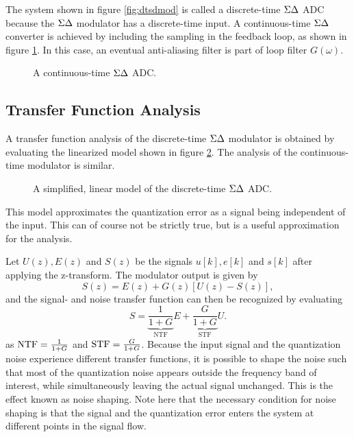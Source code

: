 The system shown in figure \ref{fig:dtsdmod} is called a discrete-time $\Sigma\Delta$ ADC because the $\Sigma\Delta$ modulator has a discrete-time input. A continuous-time $\Sigma\Delta$ converter is achieved by including the sampling in the feedback loop, as shown in figure \ref{fig:ctsdmod}. In this case, an eventual anti-aliasing filter is part of loop filter $G(\omega)$.
\begin{figure}[htbp]
    
    \centering
    \caption{A continuous-time $\Sigma\Delta$ ADC.}
    \label{fig:ctsdmod}
\end{figure}

\subsection{Transfer Function Analysis}
\label{sec:sd_tf_analysis}
A transfer function analysis of the discrete-time $\Sigma\Delta$ modulator is obtained by evaluating the linearized model shown in figure \ref{fig:dtsdmod_lin}. The analysis of the continuous-time modulator is similar.
\begin{figure}[htbp]
    
    \centering
    \caption{A simplified, linear model of the discrete-time $\Sigma\Delta$ ADC.}
    \label{fig:dtsdmod_lin}
\end{figure}
This model approximates the quantization error as a signal being independent of the input. This can of course not be strictly true, but is a useful approximation for the analysis.

Let $U(z), E(z)$ and $S(z)$ be the signals $u[k], e[k]$ and $s[k]$ after applying the z-transform. The modulator output is given by
\begin{equation}
    S(z) = E(z) + G(z)[U(z) - S(z)],
\end{equation}
and the signal- and noise transfer function can then be recognized by evaluating
\begin{equation}
    \label{eq:ctsd_tf}
    S = \underbrace{\frac{1}{1+G}}_\text{NTF}E + \underbrace{\frac{G}{1 + G}}_\text{STF}U.
\end{equation}
as $\text{NTF} = \frac{1}{1+G}$ and $\text{STF} = \frac{G}{1 + G}$. Because the input signal and the quantization noise experience different transfer functions, it is possible to shape the noise such that most of the quantization noise appears outside the frequency band of interest, while simultaneously leaving the actual signal unchanged. This is the effect known as noise shaping. Note here that the necessary condition for noise shaping is that the signal and the quantization error enters the system at different points in the signal flow.
